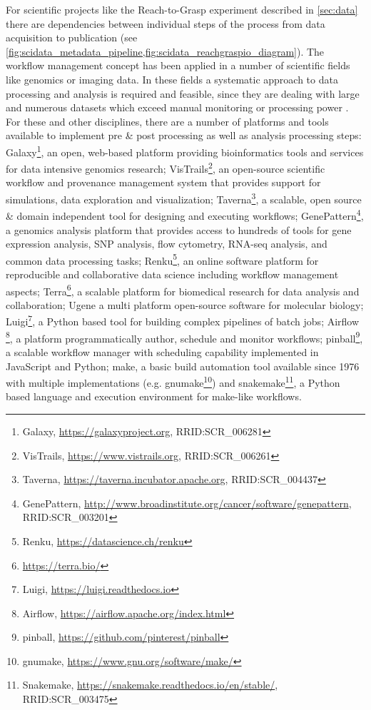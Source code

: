 For scientific projects like the Reach-to-Grasp experiment described in \cref{sec:data} there are dependencies between individual steps of the process from data acquisition to publication (see \cref{fig:scidata_metadata_pipeline,fig:scidata_reachgraspio_diagram}). The workflow management concept has been applied in a number of scientific fields like genomics or imaging data. In these fields a systematic approach to data processing and analysis is required and feasible, since they are dealing with large and numerous datasets which exceed manual monitoring or processing power \citep[e.g.][]{Palm_2010}.
For these and other disciplines, there are a number of platforms and tools available to implement pre \& post processing as well as analysis processing steps: Galaxy\footnote{Galaxy, \url{https://galaxyproject.org}, RRID:SCR\_006281}, an  open, web-based platform providing bioinformatics tools and services for data intensive genomics research; VisTrails\footnote{VisTrails, \url{https://www.vistrails.org}, RRID:SCR\_006261}, an open-source scientific workflow and provenance management system that provides support for simulations, data exploration and visualization; Taverna\footnote{Taverna, \url{https://taverna.incubator.apache.org}, RRID:SCR\_004437}, a scalable, open source \& domain independent tool for designing and executing workflows;  GenePattern\footnote{GenePattern, \url{http://www.broadinstitute.org/cancer/software/genepattern}, RRID:SCR\_003201}, a genomics analysis platform that provides access to hundreds of tools for gene expression analysis, SNP analysis, flow cytometry, RNA-seq analysis, and common data processing tasks; Renku\footnote{Renku, \url{https://datascience.ch/renku}}, an online software platform for reproducible and collaborative data science including workflow management aspects; Terra\footnote{\url{https://terra.bio/}}, a scalable platform  for biomedical research for data analysis and collaboration; Ugene \citep{Okonechnikov_2012} a multi platform open-source software for molecular biology; Luigi\footnote{Luigi, \url{https://luigi.readthedocs.io}}, a Python based tool for building complex pipelines of batch jobs; Airflow \footnote{Airflow, \url{https://airflow.apache.org/index.html}}, a platform programmatically author, schedule and monitor workflows; pinball\footnote{pinball, \url{https://github.com/pinterest/pinball}}, a scalable workflow manager with scheduling capability implemented in JavaScript and Python; make, a basic build automation tool available since 1976 with multiple implementations (e.g. gnumake\footnote{gnumake, \url{https://www.gnu.org/software/make/}}) and snakemake\footnote{Snakemake, \url{https://snakemake.readthedocs.io/en/stable/}, RRID:SCR\_003475}, a Python based language and execution environment for make-like workflows. 

